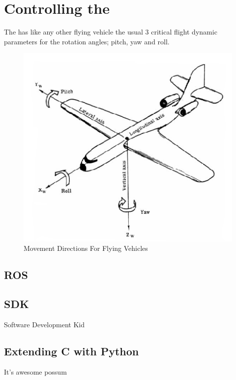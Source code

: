 \section{Controlling the \Ardrone}
The \Ardrone has like any other flying vehicle the usual 3 critical flight dynamic parameters for the rotation angles; pitch, yaw and roll. 

\begin{figure}[h!]
  \centering
      \includegraphics[scale=0.5]{pitchYawRoll.png}
  \caption{Movement Directions For Flying Vehicles}
\end{figure}

\subsection{ROS}

\subsection{SDK}
Software Development Kid

\subsection{Extending C with Python}
It's awesome possum

